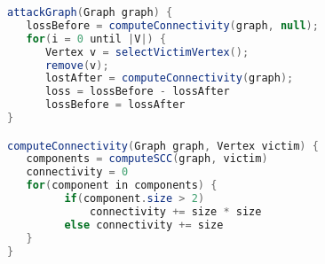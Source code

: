 \begin{lstlisting}[language=java]
attackGraph(Graph graph) {
   lossBefore = computeConnectivity(graph, null);
   for(i = 0 until |V|) {
      Vertex v = selectVictimVertex();
      remove(v);
      lostAfter = computeConnectivity(graph);
      loss = lossBefore - lossAfter
      lossBefore = lossAfter
}

computeConnectivity(Graph graph, Vertex victim) {
   components = computeSCC(graph, victim)
   connectivity = 0
   for(component in components) {
         if(component.size > 2) 
             connectivity += size * size
         else connectivity += size
   }
}
\end{lstlisting} 




